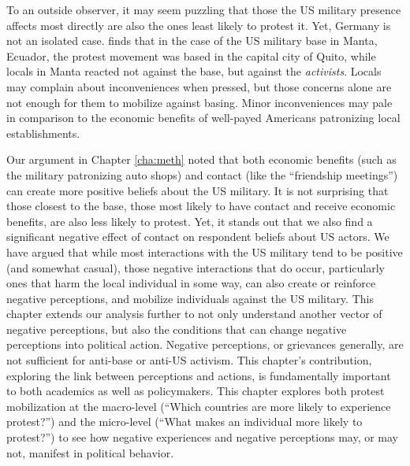 
To an outside observer, it may seem puzzling that those the US military presence affects most directly are also the ones least likely to protest it. Yet, Germany is not an isolated case.  finds that in the case of the US military base in Manta, Ecuador, the protest movement was based in the capital city of Quito, while locals in Manta reacted not against the base, but against the \textit{activists}. Locals may complain about inconveniences when pressed, but those concerns alone are not enough for them to mobilize against basing. Minor inconveniences may pale in comparison to the economic benefits of well-payed Americans patronizing local establishments.


Our argument in Chapter \ref{cha:meth} noted that both economic benefits (such as the military patronizing auto shops) and contact (like the ``friendship meetings'') can create more positive beliefs about the US military. It is not surprising that those closest to the base, those most likely to have contact and receive economic benefits, are also less likely to protest. Yet, it stands out that we also find a significant negative effect of contact on respondent beliefs about US actors. We have argued that while most interactions with the US military tend to be positive  (and somewhat casual), those negative interactions that do occur, particularly ones that harm the local individual in some way, can also create or reinforce negative perceptions, and mobilize individuals against the US military. This chapter extends our analysis further to not only understand another vector of negative perceptions, but also the conditions that can change negative perceptions into political action. Negative perceptions, or grievances generally, are not sufficient for anti-base or anti-US activism. This chapter's contribution, exploring the link between perceptions and actions, is fundamentally important to both academics as well as policymakers. This chapter explores both protest mobilization at the macro-level (``Which countries are more likely to experience protest?'') and the micro-level (``What makes an individual more likely to protest?'') to see how negative experiences and negative perceptions may, or may not, manifest in political behavior. 

